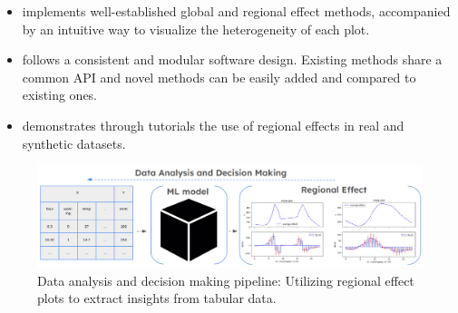 \documentclass[
twocolumn,
]{ceurart}
\begin{document}


\begin{itemize}
\item implements well-established global and regional effect methods, accompanied by an intuitive way to visualize the heterogeneity of each plot. 
\item follows a consistent and modular software design. Existing methods share a common API and novel methods can be easily added and compared to existing ones.
\item demonstrates through tutorials the use of regional effects in real and synthetic datasets.
\end{itemize}

\begin{figure}[t]
    \centering
    \includegraphics[width=\textwidth]{figures/concept_image.png}
    \caption{Data analysis and decision making pipeline: Utilizing regional effect plots to extract insights from tabular data.}
    \label{fig:concept_figure}
\end{figure}
\end{document}
